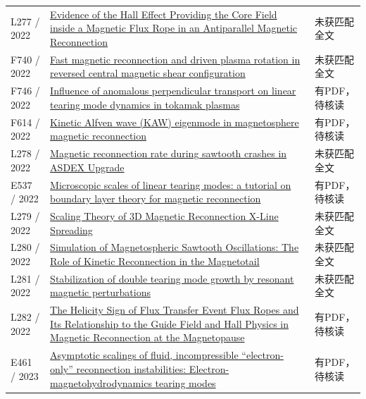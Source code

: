\begin{longtable}{P{24mm}P{97mm}P{27mm}}
L277 / 2022 & \href{https://doi.org/10.3847/1538-4357/aca27f}{Evidence of the Hall Effect Providing the Core Field inside a Magnetic Flux Rope in an Antiparallel Magnetic Reconnection} & 未获匹配全文\\

F740 / 2022 & \href{https://doi.org/10.1088/1741-4326/ac984f}{Fast magnetic reconnection and driven plasma rotation in reversed central magnetic shear configuration} & 未获匹配全文\\

F746 / 2022 & \href{https://doi.org/10.1063/5.0082331}{Influence of anomalous perpendicular transport on linear tearing mode dynamics in tokamak plasmas} & 有PDF，待核读\\

F614 / 2022 & \href{https://doi.org/10.1007/s41614-022-00107-y}{Kinetic Alfven wave (KAW) eigenmode in magnetosphere magnetic reconnection} & 有PDF，待核读\\

L278 / 2022 & \href{https://doi.org/10.1088/1741-4326/ac6617}{Magnetic reconnection rate during sawtooth crashes in ASDEX Upgrade} & 未获匹配全文\\

E537 / 2022 & \href{https://doi.org/10.1017/s0022377822001088}{Microscopic scales of linear tearing modes: a tutorial on boundary layer theory for magnetic reconnection} & 有PDF，待核读\\

L279 / 2022 & \href{https://doi.org/10.33915/etd.11608}{Scaling Theory of 3D Magnetic Reconnection X-Line Spreading} & 未获匹配全文\\

L280 / 2022 & \href{https://doi.org/10.1029/2022gl099638}{Simulation of Magnetospheric Sawtooth Oscillations: The Role of Kinetic Reconnection in the Magnetotail} & 未获匹配全文\\

L281 / 2022 & \href{https://doi.org/10.1088/1741-4326/ac8f59}{Stabilization of double tearing mode growth by resonant magnetic perturbations} & 未获匹配全文\\

L282 / 2022 & \href{https://doi.org/10.1029/2022ja030686}{The Helicity Sign of Flux Transfer Event Flux Ropes and Its Relationship to the Guide Field and Hall Physics in Magnetic Reconnection at the Magnetopause} & 有PDF，待核读\\

E461 / 2023 & \href{https://doi.org/10.1063/5.0155211}{Asymptotic scalings of fluid,  incompressible “electron-only” reconnection instabilities: Electron-magnetohydrodynamics tearing modes} & 有PDF，待核读\\


\end{longtable}
